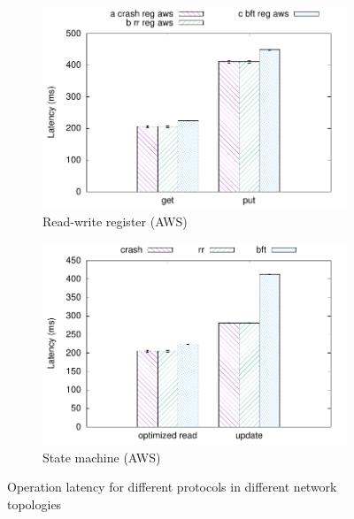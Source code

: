 \begin{figure}[th!]
    \begin{subfigure}[t]{0.24 * 10cm}
        \includegraphics[width=\linewidth]{teem_results/protocol/aws/aws_reg}
        \caption{Read-write register (AWS)}\label{fig:aws_reg_lat}
    \end{subfigure}
    \begin{subfigure}[t]{0.24 * 10cm}
        \centering
        \includegraphics[width=\linewidth]{teem_results/protocol/aws/aws_smr}
        \caption{State machine (AWS)}\label{fig:aws_smr_lat}
    \end{subfigure}
    \caption{Operation latency for different protocols in
    different network topologies}
\end{figure}\label{fig:protocol_lat}


